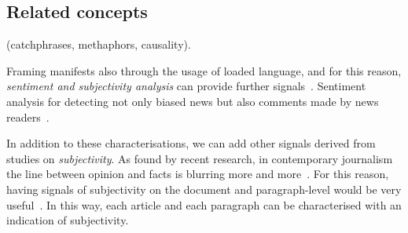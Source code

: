 

\subsection{Related concepts}
\label{ssec:lit_framing_other}


\cite{mandal2017overview,gao2018neural,asghar2016automatic} (catchphrases, methaphors, causality).

Framing manifests also through the usage of loaded language, and for this reason, \textit{sentiment and subjectivity analysis} can provide further signals~\cite{liu2010sentiment}.
Sentiment analysis for detecting not only biased news but also comments made by news readers~\cite{park2011politics}.


In addition to these characterisations, we can add other signals derived from studies on \emph{subjectivity}.
As found by recent research, in contemporary journalism the line between opinion and facts is blurring more and more~\cite{blake2019news}. For this reason, having signals of subjectivity on the document and paragraph-level would be very useful~\cite{liu2010sentiment}.
In this way, each article and each paragraph can be characterised with an indication of subjectivity.



